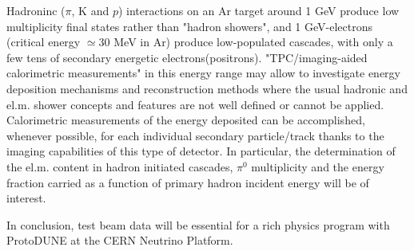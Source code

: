  Hadroninc ($\pi$, K and $p$) interactions on an Ar target around 1 GeV produce low multiplicity final states rather than "hadron showers", 
 and 1 GeV-electrons  (critical energy $\simeq 30$ MeV in Ar) produce low-populated cascades, with only a few tens of secondary energetic electrons(positrons). 
"TPC/imaging-aided calorimetric measurements" in this energy range may allow to investigate 
energy deposition mechanisms and reconstruction methods where the usual hadronic and el.m. shower concepts and features are not well defined or cannot be applied.
Calorimetric measurements of the energy deposited can be accomplished,  whenever possible, for each individual secondary particle/track thanks to the imaging capabilities of this type of detector.
In particular, the determination of the el.m. content in hadron initiated cascades, $\pi^0$ multiplicity and the energy fraction carried as a function of primary hadron incident energy will be of interest.

In conclusion, test beam data will be essential for a rich physics program with ProtoDUNE at the CERN Neutrino Platform.
